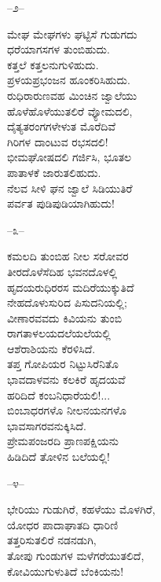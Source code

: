 \begin{center}
–೨–
\end{center}

ಮೇಘ ಮೇಘಗಳು ಘಟ್ಟಿಸೆ ಗುಡುಗದು\\ಧರೆಯಾಗಸಗಳ ತುಂಬಿಹುದು.\\ಕತ್ತಲೆ ಕತ್ತಲನುಗುಳಿಹುದು.\\ಪ್ರಳಯಪ್ರಭಂಜನ ಹೂಂಕರಿಸಿಹುದು.\\ರುಧಿರಾರುಣವಹ ಮಿಂಚಿನ ಜ್ವಾಲೆಯು\\ಹೊಳೆಹೊಳೆಯುತಲಿರೆ ವ್ಯೋಮದಲಿ,\\ದೈತ್ಯತರಂಗಗಳೇಳುತ ಮೊರೆದಿವೆ\\ಗಿರಿಗಳ ದಾಂಟುವ ರಭಸದಲಿ!\\ಭೀಮಘೋಷದಲಿ ಗರ್ಜಿಸಿ, ಭೂತಲ\\ಪಾತಾಳಕೆ ಜಾರುತಲಿಹುದು.\\ನೆಲವ ಸೀಳಿ ಘನ ಜ್ವಾಲೆ ಸಿಡಿಯುತಿರೆ\\ಪರ್ವತ ಪುಡಿಪುಡಿಯಾಗಿಹುದು!

\begin{center}
–೩–
\end{center}

ಕಮಲದಿ ತುಂಬಿಹ ನೀಲ ಸರೋವರ\\ತೀರದೊಳೆಸೆದಿಹ ಭವನದೊಳಲ್ಲಿ\\ಹೃದಯರುಧಿರರಸ ಮದಿರೆಯುಕ್ಕುತಿದೆ\\ನೇಹದೊಳುಸುರಿದ ಪಿಸುದನಿಯಲ್ಲಿ;\\ವೀಣಾರವವದು ಕಿವಿಯನು ತುಂಬಿ\\ರಾಗತಾಳಲಯದಲೆಯಲೆಯಲ್ಲಿ\\ಆಶೆರಾಶಿಯನು ಕೆರಳಿಸಿದೆ.\\ತಪ್ತ ಗೋಪಿಯರ ನಿಟ್ಟುಸಿರೆನಿತೊ\\ಭಾವದಾಳವನು ಕಲಕಿರೆ ಹೃದಯವೆ\\ಹರಿದಿದೆ ಕಂಬನಿಧಾರೆಯಲಿ!...\\ಬಿಂಬಾಧರಗಳೊ ನೀಲನಯನಗಳೊ\\ಭಾವಸಾಗರವನುಕ್ಕಿಸಿದೆ.\\ಪ್ರೇಮಪಂಜರದಿ ಪ್ರಾಣಪಕ್ಷಿಯನು\\ಹಿಡಿದಿದೆ ತೋಳಿನ ಬಲೆಯಲ್ಲಿ!

\begin{center}
–೪–
\end{center}

ಭೇರಿಯು ಗುಡುಗಿರೆ, ಕಹಳೆಯು ಮೊಳಗಿರೆ,\\ಯೋಧರ ಪಾದಾಘಾತದಿ ಧಾರಿಣಿ\\ತತ್ತರಿಸುತಲಿರೆ ನಡನಡುಗಿ,\\ತೋಪು ಗುಂಡುಗಳ ಮಳೆಗರೆಯುತಲಿದೆ,\\ಕೋವಿಯುಗುಳುತಿದೆ ಬೆಂಕಿಯನು!

